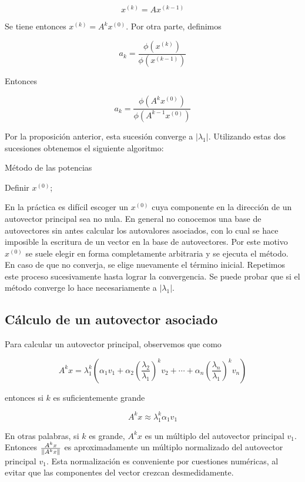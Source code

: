 \[x^{(k)} = Ax^{(k - 1)}\]

Se tiene entonces $x^{(k)} = A^kx^{(0)}$. Por otra parte, definimos

\[a_k = \frac{\phi(x^{(k)})}{\phi(x^{(k - 1)})}\]

Entonces

\[a_k = \frac{\phi(A^k x^{(0)})}{\phi(A^{k - 1}x^{(0)})}\]

Por la proposición anterior, esta sucesión converge a $|\lambda_1|$. Utilizando estas dos sucesiones obtenemos el siguiente algoritmo:

\begin{algorithm}
\caption[]{Método de las potencias}
Definir $x^{(0)}$;\\
\end{algorithm}

\begin{obs}
En la práctica es difícil escoger un $x^{(0)}$ cuya componente en la dirección de un autovector principal sea no nula. En general no conocemos una base de autovectores sin antes calcular los autovalores asociados, con lo cual se hace imposible la escritura de un vector en la base de autovectores.
Por este motivo $x^{(0)}$ se suele elegir en forma completamente arbitraria y se ejecuta el método. En caso de que no converja, se elige nuevamente el término inicial. Repetimos este proceso sucesivamente hasta lograr la convergencia. Se puede probar que si el método converge lo hace necesariamente a  $|\lambda_1|$.
\end{obs}

\subsection{Cálculo de un autovector asociado}

Para calcular un autovector principal, observemos que como

\[A^k x = \lambda_1^k \left(\alpha_1 v_1 + \alpha_2 \left(\frac{\lambda_2}{\lambda_1}\right)^k v_2 + \cdots + \alpha_n \left(\frac{\lambda_n}{\lambda_1}\right)^k v_n\right)\]

entonces si $k$ es suficientemente grande

\[A^k x \approx \lambda_1^k \alpha_1 v_1\]

En otras palabras, si $k$ es grande, $A^k x$ es un múltiplo del autovector principal $v_1$. Entonces $\frac{A^kx}{\left\lVert A^kx\right\rVert}$ es aproximadamente un múltiplo normalizado del autovector principal $v_1$. Esta normalización es conveniente por cuestiones numéricas, al evitar que las componentes del vector crezcan desmedidamente.

